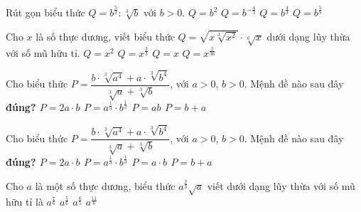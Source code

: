 \begin{ex}%
	Rút gọn biểu thức $Q=b^{\tfrac{5}{3}}\colon\sqrt[3]{b}$ với $b>0$. 
	\choice
	{$Q=b^2$}
	{$Q=b^{-\tfrac{4}{3}}$}
	{\True $Q=b^{\tfrac{4}{3}}$}
	{$Q=b^{\tfrac{5}{9}}$}
\end{ex}
\begin{ex}%
	Cho $x$ là số thực dương, viết biểu thức $Q=\sqrt{x\sqrt[3]{x^2}}\cdot\sqrt[6]{x}$ dưới dạng lũy thừa với số mũ hữu tỉ. 
	\choice
	{$Q=x^2$}
	{$Q=x^{\tfrac{2}{3}}$}
	{\True $Q=x$}
	{$Q=x^{\tfrac{5}{36}}$}
\end{ex}
\begin{ex}%
	Cho biểu thức $P=\dfrac{b \cdot \sqrt[3]{a^4}+a \cdot \sqrt[3]{b^4}}{\sqrt[3]{a}+\sqrt[3]{b}} $, với $a>0$, $b>0$. Mệnh đề nào sau đây \bf{đúng}?
	\choice
	{$P=2a \cdot b$}
	{$P=a^{\tfrac{1}{3}} \cdot b^{\tfrac{1}{3}} $}
	{\True $P=ab$}
	{$P=b+a$}
\end{ex}
\begin{ex}%
	Cho biểu thức $P=\dfrac{b \cdot \sqrt[3]{a^4}+a \cdot \sqrt[3]{b^4}}{\sqrt[3]{a}+\sqrt[3]{b}}$, với $a>0$, $b>0$. Mệnh đề nào sau đây \bf{đúng}?
	\choice
	{$P=2a \cdot b$}
	{$P=a^{\tfrac{1}{3}} \cdot b^{\tfrac{1}{3}}$}
	{\True $P=a \cdot b$}
	{$P=b+a$}
\end{ex}
\begin{ex}%
	Cho $a$ là một số thực dương, biểu thức $a^{\tfrac{2}{3}}\sqrt{a}$ viết dưới dạng lũy thừa với số mũ hữu tỉ là 
	\choice
	{\True $a^{\tfrac{7}{6}}$}
	{$a^{\tfrac{5}{6}}$}
	{$a^{\tfrac{6}{5}}$}
	{$a^{\tfrac{11}{6}}$}
\end{ex}
